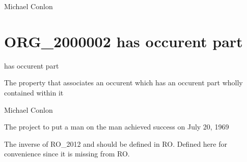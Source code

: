 \documentclass[letterpaper,10pt,english]{sphinxmanual}
\begin{document}
\begin{sphinxShadowBox}

\sphinxAtStartPar
Michael Conlon 
\end{sphinxShadowBox}
\begin{quote}
\label{\detokenize{doc-ORG_2000002:org-2000002}}\label{\detokenize{doc-ORG_2000002:has-occurent-part}}\label{\detokenize{doc-ORG_2000002:org-2000002}}
\ignorespaces \end{quote}


\section{ORG\_2000002 \sphinxhyphen{} has occurent part}
\label{\detokenize{doc-ORG_2000002:org-2000002-has-occurent-part}}\label{\detokenize{doc-ORG_2000002:index-0}}\label{\detokenize{doc-ORG_2000002::doc}}
\begin{sphinxShadowBox}

\sphinxAtStartPar
has occurent part
\end{sphinxShadowBox}

\begin{sphinxShadowBox}

\sphinxAtStartPar
The property that associates an occurent which has an occurent part wholly contained within it
\end{sphinxShadowBox}

\begin{sphinxShadowBox}

\sphinxAtStartPar
Michael Conlon 
\end{sphinxShadowBox}

\begin{sphinxShadowBox}

\sphinxAtStartPar
The project to put a man on the man achieved success on July 20, 1969
\end{sphinxShadowBox}

\begin{sphinxShadowBox}

\sphinxAtStartPar
The inverse of RO\_2012 and should be defined in RO.  Defined here for convenience since it is missing from RO.
\end{sphinxShadowBox}
\end{document}
